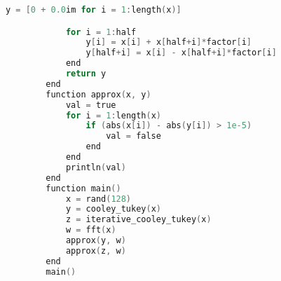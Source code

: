 \begin{lstlisting}[language=C, caption= Algorithme de Cooley-Tukey avec des diagrammes papillon]
		    y = [0 + 0.0im for i = 1:length(x)]

		    for i = 1:half
		        y[i] = x[i] + x[half+i]*factor[i]
		        y[half+i] = x[i] - x[half+i]*factor[i]
		    end
		    return y
		end
		function approx(x, y)
		    val = true
		    for i = 1:length(x)
		        if (abs(x[i]) - abs(y[i]) > 1e-5)
		            val = false
		        end
		    end
		    println(val)
		end
		function main()
		    x = rand(128)
		    y = cooley_tukey(x)
		    z = iterative_cooley_tukey(x)
		    w = fft(x)
		    approx(y, w)
		    approx(z, w)
		end
		main()
	\end{lstlisting}

\begin{comment}

\section{Analyse fonctionelle et analyse de Fourier}

	La STFT est une version locale de la transformation de Fourier. Normalement, pour effectuer la transformation de Fourier, on part d'une fonction $f(x)$ qui appartient à l'espace Lebesgue $L^{2} (\mathbb{R}^k)$ soit à $L^{1} (\mathbb{R}^k)$ et on obtient une fonction $\hat{f}(\omega)$ qui appartient respectivement à $L^{2} (\mathbb{R}^k)$ ou à $C_{0}(\mathbb{R}^{k})$\footnote{L'espace des fonctions continues qui tendent vers $0$ à l'infini}. L'espace $L^2$ est l'espace des fonctions de carré intégrable.

	Si la transformée de Fourier de {{mvar|f}}, notée <math>\hat f</math>, est elle-même une [[fonction intégrable]], la formule dite de transformation de Fourier inverse, opération notée <math>\mathcal F^{-1}</math>, et appliquée à <math>\hat f</math>, permet (sous conditions appropriées) de retrouver {{mvar|f}} à partir des données fréquentielles :
	$$ 
	f(x)= F^{-1} (\hat f)(x)={1 \over 2\pi}\, \int_{-\infty}^{+\infty} \hat f(\xi)\, e^{+{\rm i}\xi x} \; d\xi \iff \hat f(\xi) = \int_{-\infty}^{+\infty} f(x) \mathrm e^{-{\rm i}\xi x}\,\mathrm 
	$$

	Pour résumer, on a bien un isomorphisme isométrique sur la transformation de Fourier de $L^2(\mathbb{R}^k)$ en $L^2(\mathbb{R}^k)$, ce qui de manière symbolique est traduit par \footnote{Karlheinz Gröchenig, \textit{Foundations of Time-Frequency Analysis}, 2001. \nocite{Grochenig}} :
	$$
	\begin{matrix}
	\mathcal{F} : & L^2(\mathbb{R}^k) & \rightarrow & L^2(\mathbb{R}^k) \\
	& f & \mapsto & \hat{f}
	\end{matrix}
	$$
	et
	$$ \mathcal{F} \circ \mathcal{F}^{-1} = \mathcal{F}^{-1} \circ \mathcal{F} = Id $$


\end{comment}
